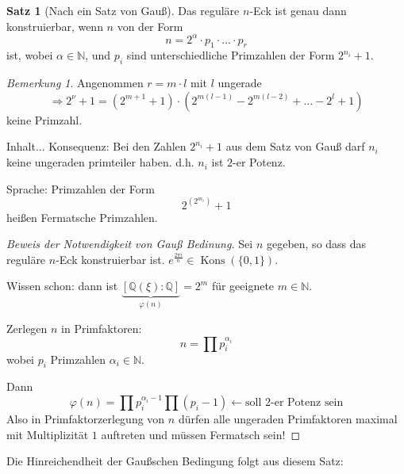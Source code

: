 \documentclass[12pt,parskip=full]{scrartcl}
\newcommand{\setN}{\mathbb{N}}
\newcommand{\setQ}{\mathbb{Q}}
\theoremstyle{definition}
\newtheorem{theorem}{Satz}[section]
\theoremstyle{remark}
\newtheorem*{remark}{Bemerkung}
\begin{document}
	\begin{theorem}[Nach ein Satz von Gauß]
		Das reguläre $n$-Eck ist genau dann konstruierbar, wenn $n$ von der Form
		\begin{equation*}
			n = 2^\alpha \cdot p_1 \cdot \dots \cdot p_r
		\end{equation*}
		ist, wobei $\alpha \in \setN$, und $p_i$ sind unterschiedliche Primzahlen der Form $2^{n_i} + 1$.
	\end{theorem}

	\begin{remark}
		Angenommen $r = m \cdot l$ mit $l$ ungerade
		\begin{equation*}
			\Rightarrow 2^{\nu} + 1 = (2^{m+1} + 1) \cdot (2^{m(l-1)} - 2^{m(l-2)} + \dots - 2^l + 1)
		\end{equation*}
		keine Primzahl.
			
		Inhalt...
		Konsequenz: Bei den Zahlen $2^{n_i} + 1$ aus dem Satz von Gauß darf $n_i$ keine ungeraden primteiler haben. d.h. $n_i$ ist $2$-er Potenz.
		
		Sprache: Primzahlen der Form
		\begin{equation*}
			2^{(2^{m_i})} + 1
		\end{equation*}
		heißen Fermatsche Primzahlen.
	\end{remark}

	\begin{proof}[Beweis der Notwendigkeit von Gauß Bedinung]
		Sei $n$ gegeben, so dass das reguläre $n$-Eck konstruierbar ist. $e^{\frac{2\pi i}{n}} \in \operatorname{Kons}(\{ 0, 1 \})$.
		
		Wissen schon: dann ist $\underbrace{[\setQ(\xi): \setQ]}_{\varphi(n)} = 2^m$ für geeignete $m \in \setN$.
		
		Zerlegen $n$ in Primfaktoren:
		\begin{equation*}
			n = \prod p_i^{\alpha_i}
		\end{equation*}
		wobei $p_i$ Primzahlen $\alpha_i \in \setN$.
		
		Dann
		\begin{equation*}
			\varphi(n) = \prod p_i^{\alpha_i - 1} \prod (p_i - 1) \leftarrow \text{soll $2$-er Potenz sein}
		\end{equation*}
		Also in Primfaktorzerlegung von $n$ dürfen alle ungeraden Primfaktoren maximal mit Multiplizität $1$ auftreten und müssen Fermatsch sein!
	\end{proof}

	Die Hinreichendheit der Gaußschen Bedingung folgt aus diesem Satz:
	
\end{document}
